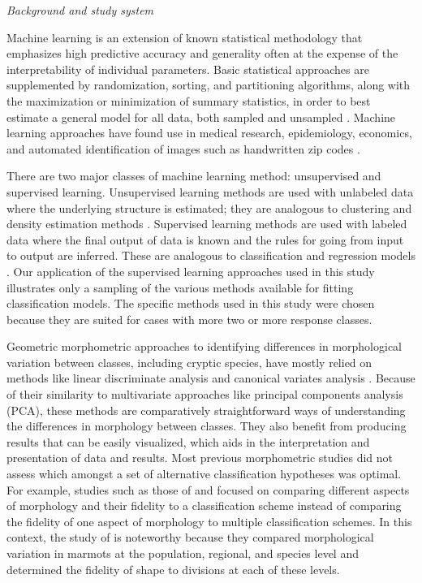 \documentclass[12pt,letterpaper]{article}
\renewcommand{\subsection}[1]{%
\bigskip
\begin{center}
\begin{large}
\normalfont\itshape #1
\end{large}
\end{center}}
\begin{document}
\subsection{Background and study system}
Machine learning is an extension of known statistical methodology \citep{Hastie2009} that emphasizes high predictive accuracy and generality often at the expense of the interpretability of individual parameters. Basic statistical approaches are supplemented by randomization, sorting, and partitioning algorithms, along with the maximization or minimization of summary statistics, in order to best estimate a general model for all data, both sampled and unsampled \citep{Hastie2009}. Machine learning approaches have found use in medical research, epidemiology, economics, and automated identification of images such as handwritten zip codes \citep{Hastie2009}. %

There are two major classes of machine learning method: unsupervised and supervised learning. Unsupervised learning methods are used with unlabeled data where the underlying structure is estimated; they are analogous to clustering and density estimation methods \citep{Kaufman1990}. Supervised learning methods are used with labeled data where the final output of data is known and the rules for going from input to output are inferred. These are analogous to classification and regression models \citep{Breiman1984,Hastie2009}. Our application of the supervised learning approaches used in this study illustrates only a sampling of the various methods available for fitting classification models. The specific methods used in this study were chosen because they are suited for cases with more two or more response classes.

Geometric morphometric approaches to identifying differences in morphological variation between classes, including cryptic species, have mostly relied on methods like linear discriminate analysis and canonical variates analysis \citep{Polly2003,Zelditch2004,Gaubert2005b,Gunduz2007,Polly2007a,Francoy2009,Sztencel-Jabonka2009,MitrovskiBogdanovic2013,Dillard2017}. Because of their similarity to multivariate approaches like principal components analysis (PCA), these methods are comparatively straightforward ways of understanding the differences in morphology between classes. They also benefit from producing results that can be easily visualized, which aids in the interpretation and presentation of data and results. Most previous morphometric studies did not assess which amongst a set of alternative classification hypotheses was optimal. For example, studies such as those of \citet{Caumul2005a} and \citet{Polly2007a} focused on comparing different aspects of morphology and their fidelity to a classification scheme instead of comparing the fidelity of one aspect of morphology to multiple classification schemes. In this context, the study of \citet{Cardini2009a} is noteworthy because they compared morphological variation in marmots at the population, regional, and species level and determined the fidelity of shape to divisions at each of these levels.
\end{document}
